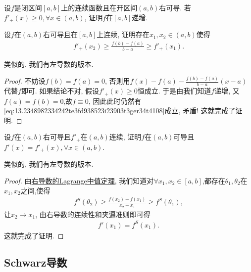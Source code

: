 \documentclass[../../main.tex]{subfiles}%
\begin{document}
\begin{corollary}[右可导函数非负则递增]\label{corollary:右可导函数非负则递增}
设$f$是闭区间$[a,b]$上的连续函数且在开区间$(a,b)$右可导. 若$f'_+(x) \geqslant 0, \forall x \in (a,b)$, 证明$f$在$[a,b]$递增.
\end{corollary}

\begin{theorem}[右导数的Lagrange中值定理]\label{theorem:右导数的Lagrange中值定理}
设$f$在$(a,b)$右可导且在$[a,b]$上连续, 证明存在$x_1,x_2 \in (a,b)$使得
\begin{align}
f'_+(x_2) \geqslant \frac{f(b) - f(a)}{b - a} \geqslant f'_+(x_1). \label{eq:13.2348982334242te3fd938523i23903t3ger34t4108}
\end{align}
\end{theorem}
\begin{note}
类似的, 我们有左导数的版本.
\end{note}
\begin{proof}
不妨设$f(b) = f(a) = 0$, 否则用$f(x) - f(a) - \frac{f(b)-f(a)}{b - a}(x - a)$代替$f$即可.
如果结论不对, 假设$f'_+(x) \geqslant 0$恒成立. 于是由我们知道$f$递增, 又$f(a)=f(b)=0$,故$f \equiv 0$, 因此此时仍然有\eqref{eq:13.2348982334242te3fd938523i23903t3ger34t4108}成立, 矛盾! 这就完成了证明.
\end{proof}

\begin{proposition}[右导数连续则原函数可导]\label{proposition:右导数连续则原函数可导}
设$f$在$(a,b)$右可导且$f'_+$在$(a,b)$连续, 证明$f$在$(a,b)$可导且$f'(x) = f'_+(x), \forall x \in (a,b)$.
\end{proposition}
\begin{note}
类似的, 我们有左导数的版本.
\end{note}
\begin{proof}
由\hyperref[theorem:右导数的Lagrange中值定理]{右导数的Lagrange中值定理}, 我们知道对$\forall x_1,x_2\in [a,b]$,都存在$\theta_1,\theta_2$在$x_1,x_2$之间,使得
\begin{align*}
f^S(\theta_2) \geqslant \frac{f(x_2) - f(x_1)}{x_2 - x_1} \geqslant f^S(\theta_1),
\end{align*}
让$x_2 \to x_1$, 由右导数的连续性和夹逼准则即可得
\begin{align*}
f'(x_1) = f^S(x_1).
\end{align*}
这就完成了证明.
\end{proof}

\subsection{Schwarz导数}
\end{document}
